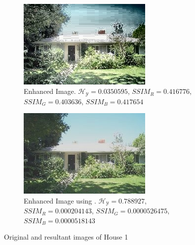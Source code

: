 \documentclass[11pt]{article}
\begin{document}
\begin{figure}[H]
    ~ %
    \begin{subfigure}[t]{0.45\textwidth}
        \includegraphics[width=\textwidth]{calhouse_0230_20-62968204656-00.jpg}
        \caption{Enhanced Image.  $\mathscr{H_Y}=0.0350595$, $SSIM_R=0.416776$, $SSIM_G=0.403636$, $SSIM_B=0.417654$}
        \label{fig:casa1enhanced2}
    \end{subfigure} 
    \begin{subfigure}[t]{0.45\textwidth}
        \includegraphics[width=\textwidth]{calhouse_0230_20-20-0020072469292179818.jpg}
        \caption{Enhanced Image using \cite{morepso}. $\mathscr{H_Y}=0.788927$, $SSIM_R=0.000204143$, $SSIM_G=0.0000526475$, $SSIM_B=0.0000518143$}
        \label{fig:casa1enhanced3}
    \end{subfigure}

    \caption{Original and resultant images of House 1}\label{fig:casa1}
\end{figure}
\end{document}
